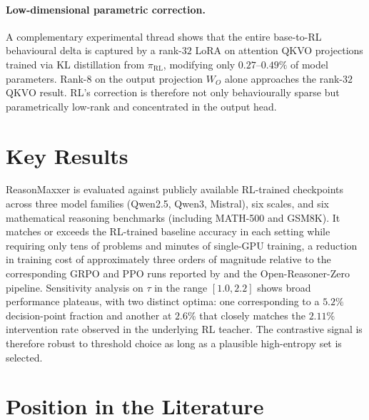 \documentclass[11pt]{article}
\begin{document}
\paragraph{Low-dimensional parametric correction.}
A complementary experimental thread shows that the entire base-to-RL behavioural delta is captured by a rank-$32$ LoRA on attention QKVO projections trained via KL distillation from $\pi_{\text{RL}}$, modifying only $0.27$--$0.49\%$ of model parameters. Rank-$8$ on the output projection $W_O$ alone approaches the rank-$32$ QKVO result. RL's correction is therefore not only behaviourally sparse but parametrically low-rank and concentrated in the output head.

\section*{Key Results}

ReasonMaxxer is evaluated against publicly available RL-trained checkpoints across three model families (Qwen2.5, Qwen3, Mistral), six scales, and six mathematical reasoning benchmarks (including MATH-500 and GSM8K). It matches or exceeds the RL-trained baseline accuracy in each setting while requiring only tens of problems and minutes of single-GPU training, a reduction in training cost of approximately three orders of magnitude relative to the corresponding GRPO and PPO runs reported by \citet{zeng2025simplerl} and the Open-Reasoner-Zero pipeline. Sensitivity analysis on $\tau$ in the range $[1.0, 2.2]$ shows broad performance plateaus, with two distinct optima: one corresponding to a $5.2\%$ decision-point fraction and another at $2.6\%$ that closely matches the $2.11\%$ intervention rate observed in the underlying RL teacher. The contrastive signal is therefore robust to threshold choice as long as a plausible high-entropy set is selected.

\section*{Position in the Literature}
\end{document}
